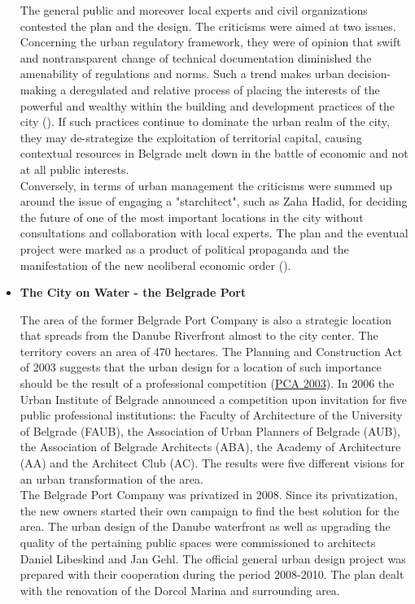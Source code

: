 \documentclass[11pt]{report}
\begin{document}
\begin{itemize}
The general public and moreover local experts and civil organizations contested the plan and the design. The criticisms were aimed at two issues. Concerning the urban regulatory framework, they were of opinion that swift and nontransparent change of technical documentation diminished the amenability of regulations and norms. Such a trend makes urban decision-making a deregulated and relative process of placing the interests of the powerful and wealthy within the building and development practices of the city (\href{Vukmirovic}{\citealt{doytchinov_belgrade:_2015}}). If such practices continue to dominate the urban realm of the city, they may de-strategize the exploitation of territorial capital, causing contextual resources in Belgrade melt down in the battle of economic and not at all public interests.
\\

Conversely, in terms of urban management the criticisms were summed up around the issue of engaging a "starchitect", such as Zaha Hadid, for deciding the future of one of the most important locations in the city without consultations and collaboration with local experts. The plan and the eventual project were marked as a product of political propaganda and the manifestation of the new neoliberal economic order (\href{Vukmirovic}{\citealt{doytchinov_belgrade:_2015}}).

\item \textbf{The City on Water - the Belgrade Port}

The area of the former Belgrade Port Company is also a strategic location that spreads from the Danube Riverfront almost to the city center. The territory covers an area of 470 hectares. The Planning and Construction Act of 2003 suggests that the urban design for a location of such importance should be the result of a professional competition  (\href{Zakon}{PCA 2003}).
In 2006 the Urban Institute of Belgrade announced a competition upon invitation for five public professional institutions: the Faculty of Architecture of the University of Belgrade (FAUB), the Association of Urban Planners of Belgrade (AUB), the Association of Belgrade Architects (ABA), the Academy of Architecture (AA) and the Architect Club (AC). The results were five different visions for an urban transformation of the area.
\\

The Belgrade Port Company was privatized in 2008. Since its privatization, the new owners started their own campaign to find the best solution for the area. The urban design of the Danube waterfront as well as upgrading the quality of the pertaining public spaces were commissioned to architects Daniel Libeskind and Jan Gehl. The official general urban design project was prepared with their cooperation during the period 2008-2010. The plan dealt with the renovation of the Dorcol Marina and surrounding area.
\\


\end{itemize}
\end{document}
